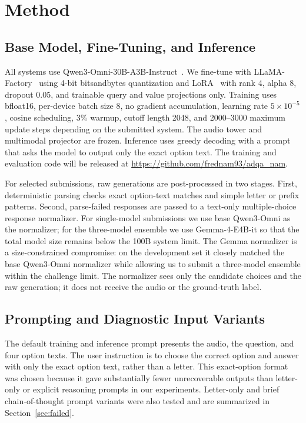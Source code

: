 \documentclass{article}
\begin{document}
\section{Method}
\vspace{-10pt}
\subsection{Base Model, Fine-Tuning, and Inference}
All systems use Qwen3-Omni-30B-A3B-Instruct~\cite{qwen3omni2025,qwen3omnihf}.
We fine-tune with LLaMA-Factory~\cite{zheng2024llamafactory} using 4-bit bitsandbytes quantization and LoRA~\cite{hu2021lora} with rank 4, alpha 8, dropout 0.05, and trainable query and value projections only.
Training uses bfloat16, per-device batch size 8, no gradient accumulation, learning rate $5\times10^{-5}$, cosine scheduling, 3\% warmup, cutoff length 2048, and 2000--3000 maximum update steps depending on the submitted system.
The audio tower and multimodal projector are frozen.
Inference uses greedy decoding with a prompt that asks the model to output only the exact option text.
The training and evaluation code will be released at \url{https://github.com/frednam93/adqa_nam}.

For selected submissions, raw generations are post-processed in two stages.
First, deterministic parsing checks exact option-text matches and simple letter or prefix patterns.
Second, parse-failed responses are passed to a text-only multiple-choice response normalizer.
For single-model submissions we use base Qwen3-Omni as the normalizer; for the three-model ensemble we use Gemma-4-E4B-it so that the total model size remains below the 100B system limit.
The Gemma normalizer is a size-constrained compromise: on the development set it closely matched the base Qwen3-Omni normalizer while allowing us to submit a three-model ensemble within the challenge limit.
The normalizer sees only the candidate choices and the raw generation; it does not receive the audio or the ground-truth label.

\subsection{Prompting and Diagnostic Input Variants}
The default training and inference prompt presents the audio, the question, and four option texts.
The user instruction is to choose the correct option and answer with only the exact option text, rather than a letter.
This exact-option format was chosen because it gave substantially fewer unrecoverable outputs than letter-only or explicit reasoning prompts in our experiments.
Letter-only and brief chain-of-thought prompt variants were also tested and are summarized in Section~\ref{sec:failed}.
\end{document}
